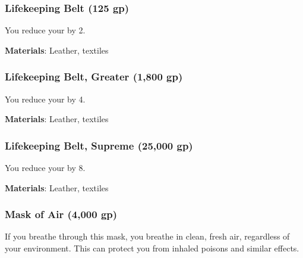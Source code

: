 \lowercase{\hypertarget{item:Lifekeeping Belt}{}}\label{item:Lifekeeping Belt}
\hypertarget{item:Lifekeeping Belt}{\subsubsection{Lifekeeping Belt\hfill{} (125 gp)}}

You reduce your  by 2.



\vspace{0.25em}
\textbf{Materials}: Leather, textiles


\lowercase{\hypertarget{item:Lifekeeping Belt, Greater}{}}\label{item:Lifekeeping Belt, Greater}
\hypertarget{item:Lifekeeping Belt, Greater}{\subsubsection{Lifekeeping Belt, Greater\hfill{} (1,800 gp)}}

You reduce your  by 4.



\vspace{0.25em}
\textbf{Materials}: Leather, textiles


\lowercase{\hypertarget{item:Lifekeeping Belt, Supreme}{}}\label{item:Lifekeeping Belt, Supreme}
\hypertarget{item:Lifekeeping Belt, Supreme}{\subsubsection{Lifekeeping Belt, Supreme\hfill{} (25,000 gp)}}

You reduce your  by 8.



\vspace{0.25em}
\textbf{Materials}: Leather, textiles


\lowercase{\hypertarget{item:Mask of Air}{}}\label{item:Mask of Air}
\hypertarget{item:Mask of Air}{\subsubsection{Mask of Air\hfill{} (4,000 gp)}}

If you breathe through this mask, you breathe in clean, fresh air, regardless of your environment.
This can protect you from inhaled poisons and similar effects.



